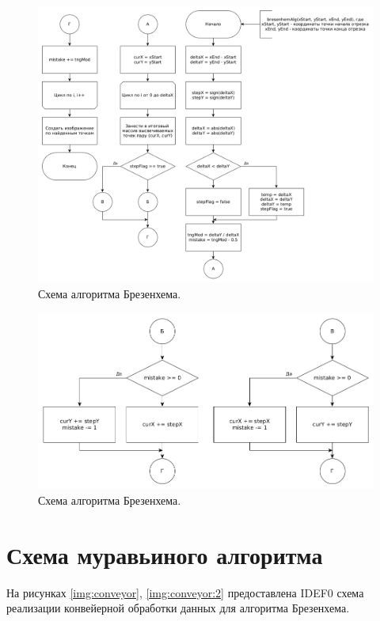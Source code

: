 \documentclass[12pt]{report}
\begin{document}
\begin{figure}
\begin{center}
\includegraphics[scale=0.4]{inc/img/bresAlg.png}
\captionsetup{justification=centering}
	\caption{Схема алгоритма Брезенхема.}
	\label{img:bresAlg}	
\end{center}
\end{figure}

\begin{figure}
\begin{center}
\includegraphics[scale=0.4]{inc/img/bresAlgPart.png}
\captionsetup{justification=centering}
	\caption{Схема алгоритма Брезенхема.}
	\label{img:bresAlgPart}	
\end{center}
\end{figure}

\newpage

\section{Схема муравьиного алгоритма}
На рисунках \ref{img:conveyor}, \ref{img:conveyor:2} предоставлена IDEF0 схема реализации конвейерной обработки данных для алгоритма Брезенхема.
\end{document}

